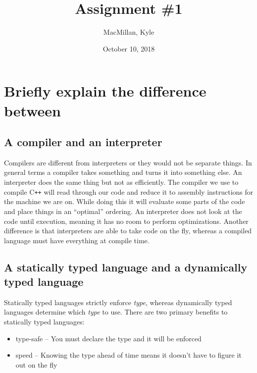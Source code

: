 \documentclass{article}
\title{\textbf{Assignment \#1}}
\author{MacMillan, Kyle}
\date{October 10, 2018}
\begin{document}
\maketitle
{}

\newpage
{}   %
\tableofcontents
{}

\newpage
\listoffigures
{}
\listoftables
{}


\newpage
{}  %
\hypersetup{
    citecolor=blue,
    filecolor=black,
    linkcolor=blue,
    urlcolor=blue
}

\setcounter{page}{1}
\section[Problem 1]{Briefly explain the difference between}
\subsection[Compilers and Interpreters]{A compiler and an interpreter}
Compilers are different from interpreters or they would not be separate things. 
In general terms a compiler takes something and turns it into something else. 
An interpreter does the same thing but not as efficiently. The compiler we use 
to compile C\texttt{++} will read through our code and reduce it to assembly 
instructions for the machine we are on. While doing this it will evaluate some 
parts of the code and place things in an ``optimal'' ordering. An interpreter 
does not look at the code until execution, meaning it has no room to perform 
optimizations. Another difference is that interpreters are able to take code on 
the fly, whereas a compiled language must have everything at compile time. 

\subsection[Statically and Dynamically Typed Languages]{A statically typed 
language and a dynamically typed language}
Statically typed languages strictly enforce \textit{type}, whereas dynamically 
typed languages determine which \textit{type} to use. There are two primary 
benefits to statically typed languages:\\
\begin{itemize}
    \item type-safe -- You must declare the type and it will be enforced
    \item speed -- Knowing the type ahead of time means it doesn't have to 
    figure it out on the fly
\end{itemize}
\end{document}
